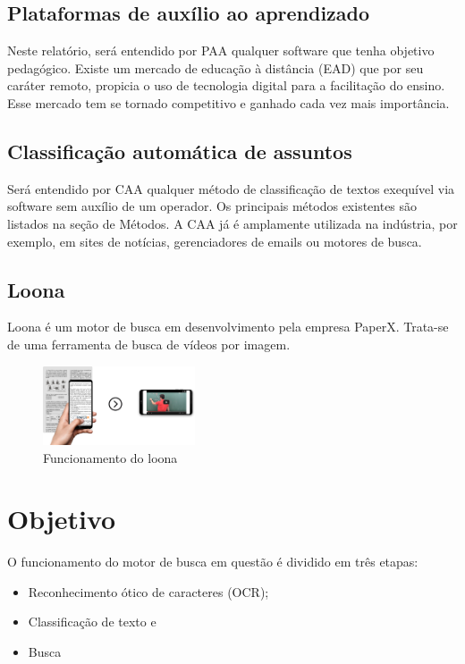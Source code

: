\subsection{Plataformas de auxílio ao aprendizado}
Neste relatório, será entendido por PAA qualquer software que tenha objetivo pedagógico. Existe um mercado de educação à distância (EAD) que por seu caráter remoto, propicia o uso de tecnologia digital para a facilitação do ensino.  Esse mercado tem se tornado competitivo e ganhado cada vez mais importância.

\subsection{Classificação automática de assuntos}

Será entendido por CAA qualquer método de classificação de textos exequível via software sem auxílio de um operador. Os principais métodos existentes são listados na seção de Métodos.
A CAA já é amplamente utilizada na indústria, por exemplo, em sites de notícias, gerenciadores de emails ou motores de busca.

\subsection{Loona}
Loona é um motor de busca em desenvolvimento pela empresa PaperX. Trata-se de uma ferramenta de busca de vídeos por imagem.

\begin{figure}[!ht]
	\centering
	\includegraphics[width=0.4\textwidth]{figures/loona.png}   
	\caption{Funcionamento do loona}
	\label{fig:loona}
\end{figure}


\section{Objetivo}
O funcionamento do motor de busca em questão é dividido em três etapas:
\begin{itemize}
\item Reconhecimento ótico de caracteres (OCR); 
\item Classificação de texto e
\item Busca
\end{itemize}

